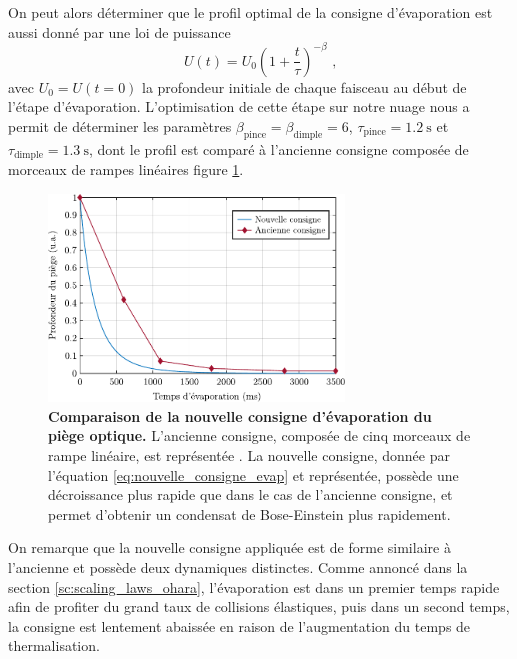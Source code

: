 On peut alors déterminer que le profil optimal de la consigne d'évaporation est aussi donné par une loi de puissance
\begin{equation}
U(t)=U_{\mathrm{0}} {\left( 1+\frac{t}{\tau}\right) }^{-\beta} \text{ ,}
\label{eq:nouvelle_consigne_evap}
\end{equation}
avec $U_{\mathrm{0}}=U(t=0)$ la profondeur initiale de chaque faisceau au début de l'étape d'évaporation. L'optimisation de cette étape sur notre nuage nous a permit de déterminer les paramètres $\beta_{\mathrm{pince}}=\beta_{\mathrm{dimple}}=6$, $\tau_{\mathrm{pince}}=\SI{1.2}{\second}$ et $\tau_{\mathrm{dimple}}=\SI{1.3}{\second}$, dont le profil est comparé à l'ancienne consigne composée de morceaux de rampes linéaires figure \ref{fig:comparaison_consigne_evap}.



\begin{figure}
\centering
\includegraphics[width=0.7\textwidth]{Fig/Modif_exp/comparaison_consignes_evap.pdf}
\caption{\textbf{Comparaison de la nouvelle consigne d'évaporation du piège optique.} L'ancienne consigne, composée de cinq morceaux de rampe linéaire, est représentée . La nouvelle consigne, donnée par l'équation \ref{eq:nouvelle_consigne_evap} et représentée, possède une décroissance plus rapide que dans le cas de l'ancienne consigne, et permet d'obtenir un condensat de Bose-Einstein plus rapidement.}
\label{fig:comparaison_consigne_evap}
\end{figure}

On remarque que la nouvelle consigne appliquée est de forme similaire à l'ancienne et possède deux dynamiques distinctes. Comme annoncé dans la section \ref{sc:scaling_laws_ohara}, l'évaporation est dans un premier temps rapide afin de profiter du grand taux de collisions élastiques, puis dans un second temps, la consigne est lentement abaissée en raison de l'augmentation du temps de thermalisation. 

